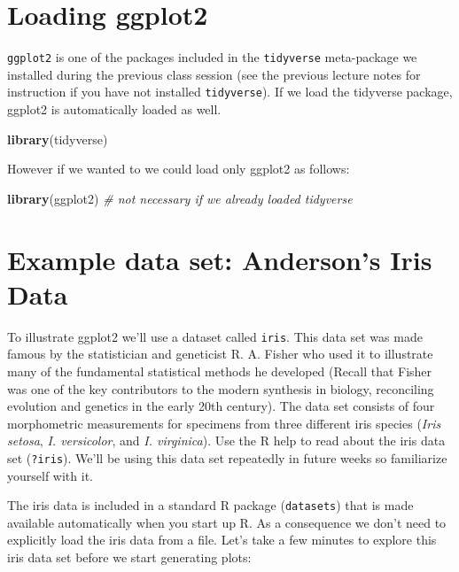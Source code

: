 \documentclass[]{book}
\newenvironment{Shaded}{\begin{snugshade}}{\end{snugshade}}
\newcommand{\CommentTok}[1]{\textcolor[rgb]{0.56,0.35,0.01}{\textit{#1}}}
\newcommand{\KeywordTok}[1]{\textcolor[rgb]{0.13,0.29,0.53}{\textbf{#1}}}
\newcommand{\NormalTok}[1]{#1}
\theoremstyle{definition}
\theoremstyle{definition}
\theoremstyle{definition}
\theoremstyle{remark}
\begin{document}
\hypertarget{loading-ggplot2}{%
\section{Loading ggplot2}\label{loading-ggplot2}}

\texttt{ggplot2} is one of the packages included in the
\texttt{tidyverse} meta-package we installed during the previous class
session (see the previous lecture notes for instruction if you have not
installed \texttt{tidyverse}). If we load the tidyverse package, ggplot2
is automatically loaded as well.

\begin{Shaded}
\begin{Highlighting}[]
\KeywordTok{library}\NormalTok{(tidyverse)}
\end{Highlighting}
\end{Shaded}

However if we wanted to we could load only ggplot2 as follows:

\begin{Shaded}
\begin{Highlighting}[]
\KeywordTok{library}\NormalTok{(ggplot2)  }\CommentTok{# not necessary if we already loaded tidyverse}
\end{Highlighting}
\end{Shaded}

\hypertarget{example-data-set-andersons-iris-data}{%
\section{Example data set: Anderson's Iris
Data}\label{example-data-set-andersons-iris-data}}

To illustrate ggplot2 we'll use a dataset called \texttt{iris}. This
data set was made famous by the statistician and geneticist R. A. Fisher
who used it to illustrate many of the fundamental statistical methods he
developed (Recall that Fisher was one of the key contributors to the
modern synthesis in biology, reconciling evolution and genetics in the
early 20th century). The data set consists of four morphometric
measurements for specimens from three different iris species (\emph{Iris
setosa}, \emph{I. versicolor}, and \emph{I. virginica}). Use the R help
to read about the iris data set (\texttt{?iris}). We'll be using this
data set repeatedly in future weeks so familiarize yourself with it.

The iris data is included in a standard R package (\texttt{datasets})
that is made available automatically when you start up R. As a
consequence we don't need to explicitly load the iris data from a file.
Let's take a few minutes to explore this iris data set before we start
generating plots:
\end{document}

